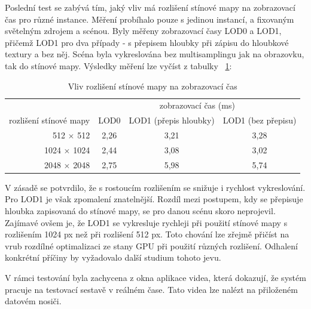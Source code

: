 \pagebreak
%
Poslední test se zabývá tím, jaký vliv má rozlišení stínové mapy na zobrazovací čas pro různé instance. Měření probíhalo pouze s jedinou instancí, a fixovaným světelným zdrojem a scénou. Byly měřeny zobrazovací časy LOD0 a LOD1, přičemž LOD1 pro dva případy - s přepisem hloubky při zápisu do hloubkové textury a bez něj. Scéna byla vykreslována bez multisamplingu jak na obrazovku, tak do stínové mapy. Výsledky měření lze vyčíst z tabulky ~\ref{table:lod01-shadow}:
\begin{table}[!hbt]
\centering
\begin{tabular}{|r | c | c | c |} 
\hline 
&\multicolumn{3}{c|}{zobrazovací čas (ms)}\\
rozlišení stínové mapy			&LOD0		&LOD1 (přepis hloubky)	&LOD1 (bez přepisu)\\
\hline					
512 $\times$ 512	&2,26	&3,21	&3,28 \\
1024 $\times$ 1024	&2,44	&3,08	&3,02\\ 
2048 $\times$ 2048	&2,75	&5,98	&5,74\\
[1ex] 
\hline 
\end{tabular}
\label{table:lod01-shadow}
\caption{Vliv rozlišení stínové mapy na zobrazovací čas}
\end{table}

V zásadě se potvrdilo, že s rostoucím rozlišením se snižuje i rychlost vykreslování. Pro LOD1 je však zpomalení znatelnější. Rozdíl mezi postupem, kdy se přepisuje hloubka zapisovaná do stínové mapy, se pro danou scénu skoro neprojevil. Zajímavé ovšem je, že LOD1 se vykresluje rychleji při použití stínové mapy s rozlišením 1024 px než při rozlišení 512 px. Toto chování lze zřejmě přičíst na vrub rozdílné optimalizaci ze stany GPU při použití různých rozlišení. Odhalení konkrétní příčiny by vyžadovalo další studium tohoto jevu.

V rámci testování byla zachycena z okna aplikace videa, která dokazují, že systém pracuje na testovací sestavě v reálném čase. Tato videa lze nalézt na přiloženém datovém nosiči.
